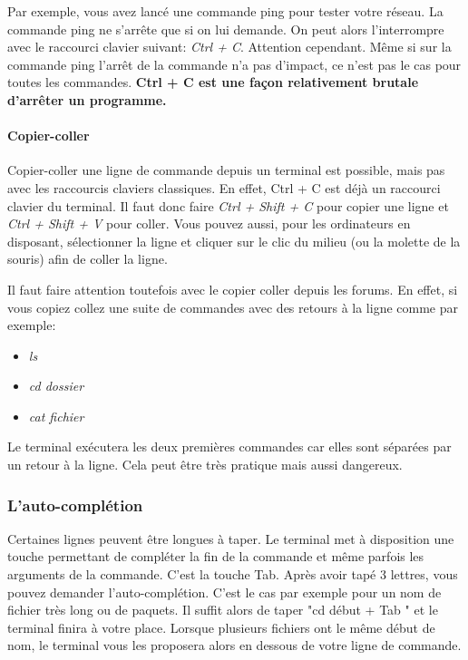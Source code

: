 Par exemple, vous avez lancé une commande ping pour tester votre réseau. La
commande ping ne s'arrête que si on lui demande. On peut alors l'interrompre
avec le raccourci clavier suivant: \textit{Ctrl + C}. Attention cependant. Même
si sur la commande ping l'arrêt de la commande n'a pas d'impact, ce n'est pas
le cas pour toutes les commandes. \textbf{Ctrl + C est une façon relativement
brutale d'arrêter un programme.}

\paragraph{Copier-coller} Copier-coller une ligne de commande depuis un
terminal est possible, mais pas avec les raccourcis claviers classiques. En
effet, Ctrl + C est déjà un raccourci clavier du terminal. Il faut donc faire
\textit{Ctrl + Shift + C} pour copier une ligne et \textit{Ctrl + Shift + V}
pour coller. Vous pouvez aussi, pour les ordinateurs en disposant, sélectionner
la ligne et cliquer sur le clic du milieu (ou la molette de la souris) afin de
coller la ligne.

Il faut faire attention toutefois avec le copier coller depuis les forums. En
effet, si vous copiez collez une suite de commandes avec des retours à la ligne
comme par exemple:

\begin{itemize}
	\item \textit{ls}
	\item \textit{cd dossier}
	\item \textit{cat fichier}
\end{itemize}

Le terminal exécutera les deux premières commandes car elles sont séparées par
un retour à la ligne. Cela peut être très pratique mais aussi dangereux.

\subsubsection{L'auto-complétion}

Certaines lignes peuvent être longues à taper. Le terminal met à disposition une
touche permettant de compléter la fin de la commande et même parfois les
arguments de la commande. C'est la touche Tab. Après avoir tapé 3 lettres, vous
pouvez demander l'auto-complétion. C'est le cas par exemple pour un nom de
fichier très long ou de paquets. Il suffit alors de taper "cd début + Tab " et
le terminal finira à votre place. Lorsque plusieurs fichiers ont le même début
de nom, le terminal vous les proposera alors en dessous de votre ligne de
commande.

